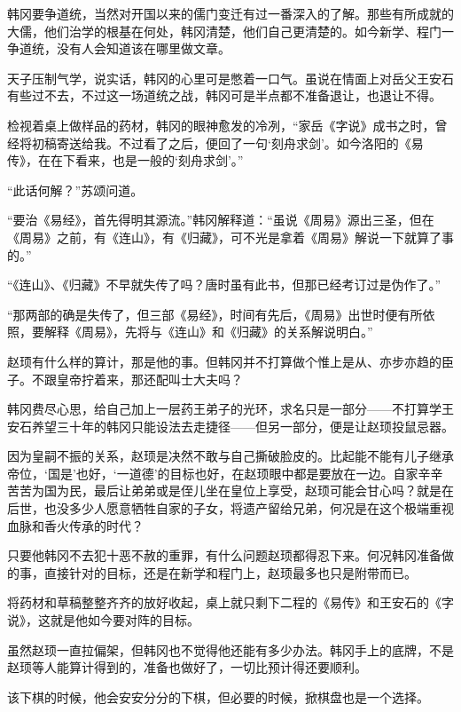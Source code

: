 韩冈要争道统，当然对开国以来的儒门变迁有过一番深入的了解。那些有所成就的大儒，他们治学的根基在何处，韩冈清楚，他们自己更清楚的。如今新学、程门一争道统，没有人会知道该在哪里做文章。 

天子压制气学，说实话，韩冈的心里可是憋着一口气。虽说在情面上对岳父王安石有些过不去，不过这一场道统之战，韩冈可是半点都不准备退让，也退让不得。 

检视着桌上做样品的药材，韩冈的眼神愈发的冷冽，“家岳《字说》成书之时，曾经将初稿寄送给我。不过看了之后，便回了一句‘刻舟求剑’。如今洛阳的《易传》，在在下看来，也是一般的‘刻舟求剑’。” 

“此话何解？”苏颂问道。 

“要治《易经》，首先得明其源流。”韩冈解释道：“虽说《周易》源出三圣，但在《周易》之前，有《连山》，有《归藏》，可不光是拿着《周易》解说一下就算了事的。” 

“《连山》、《归藏》不早就失传了吗？唐时虽有此书，但那已经考订过是伪作了。” 

“那两部的确是失传了，但三部《易经》，时间有先后，《周易》出世时便有所依照，要解释《周易》，先将与《连山》和《归藏》的关系解说明白。” 

赵顼有什么样的算计，那是他的事。但韩冈并不打算做个惟上是从、亦步亦趋的臣子。不跟皇帝拧着来，那还配叫士大夫吗？ 

韩冈费尽心思，给自己加上一层药王弟子的光环，求名只是一部分——不打算学王安石养望三十年的韩冈只能设法去走捷径——但另一部分，便是让赵顼投鼠忌器。 

因为皇嗣不振的关系，赵顼是决然不敢与自己撕破脸皮的。比起能不能有儿子继承帝位，‘国是’也好，‘一道德’的目标也好，在赵顼眼中都是要放在一边。自家辛辛苦苦为国为民，最后让弟弟或是侄儿坐在皇位上享受，赵顼可能会甘心吗？就是在后世，也没多少人愿意牺牲自家的子女，将遗产留给兄弟，何况是在这个极端重视血脉和香火传承的时代？ 

只要他韩冈不去犯十恶不赦的重罪，有什么问题赵顼都得忍下来。何况韩冈准备做的事，直接针对的目标，还是在新学和程门上，赵顼最多也只是附带而已。 

将药材和草稿整整齐齐的放好收起，桌上就只剩下二程的《易传》和王安石的《字说》，这就是他如今要对阵的目标。 

虽然赵顼一直拉偏架，但韩冈也不觉得他还能有多少办法。韩冈手上的底牌，不是赵顼等人能算计得到的，准备也做好了，一切比预计得还要顺利。 

该下棋的时候，他会安安分分的下棋，但必要的时候，掀棋盘也是一个选择。

